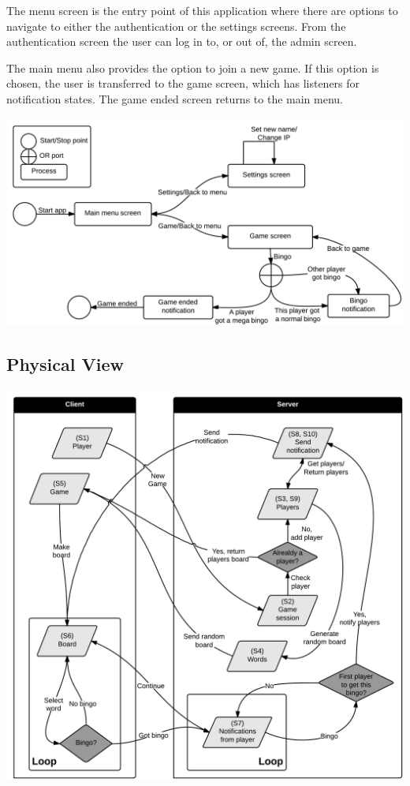 The menu screen is the entry point of this application where there are options
to navigate to either the authentication or the settings screens. From the
authentication screen the user can log in to, or out of, the admin screen.

The main menu also provides the option to join a new game. If this option is
chosen, the user is transferred to the game screen, which has listeners for
notification states. The game ended screen returns to the main menu.
\begin{center}
\includegraphics[clip=true, width=0.9 \textwidth]{Pikks/ProcessViewFinal.png}
\label{ref:gantt}
\end{center}

\subsection{Physical View}
\begin{center}
\includegraphics[clip=true, width=0.9 \textwidth]{Pikks/PhysicalViewFinal}
\end{center}

